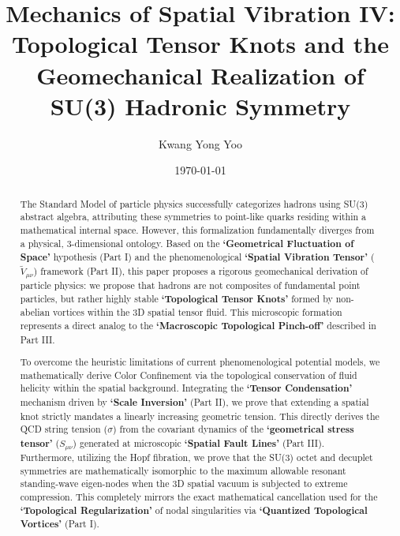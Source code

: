 \documentclass[reprint,amsmath,amssymb,aps,prd]{revtex4-2}
\begin{document}

\title{Mechanics of Spatial Vibration IV: Topological Tensor Knots and the Geomechanical Realization of SU(3) Hadronic Symmetry}

\author{Kwang Yong Yoo}

\date{\today}

\begin{abstract}
The Standard Model of particle physics successfully categorizes hadrons using SU(3) abstract algebra, attributing these symmetries to point-like quarks residing within a mathematical internal space. However, this formalization fundamentally diverges from a physical, 3-dimensional ontology. Based on the \textbf{`Geometrical Fluctuation of Space'} hypothesis (Part I) and the phenomenological \textbf{`Spatial Vibration Tensor'} ($\tilde{V}_{\mu\nu}$) framework (Part II), this paper proposes a rigorous geomechanical derivation of particle physics: we propose that hadrons are not composites of fundamental point particles, but rather highly stable \textbf{`Topological Tensor Knots'} formed by non-abelian vortices within the 3D spatial tensor fluid. This microscopic formation represents a direct analog to the \textbf{`Macroscopic Topological Pinch-off'} described in Part III.

To overcome the heuristic limitations of current phenomenological potential models, we mathematically derive Color Confinement via the topological conservation of fluid helicity within the spatial background. Integrating the \textbf{`Tensor Condensation'} mechanism driven by \textbf{`Scale Inversion'} (Part II), we prove that extending a spatial knot strictly mandates a linearly increasing geometric tension. This directly derives the QCD string tension ($\sigma$) from the covariant dynamics of the \textbf{`geometrical stress tensor'} ($S_{\mu\nu}$) generated at microscopic \textbf{`Spatial Fault Lines'} (Part III). Furthermore, utilizing the Hopf fibration, we prove that the SU(3) octet and decuplet symmetries are mathematically isomorphic to the maximum allowable resonant standing-wave eigen-nodes when the 3D spatial vacuum is subjected to extreme compression. This completely mirrors the exact mathematical cancellation used for the \textbf{`Topological Regularization'} of nodal singularities via \textbf{`Quantized Topological Vortices'} (Part I).


\end{abstract}
\end{document}
